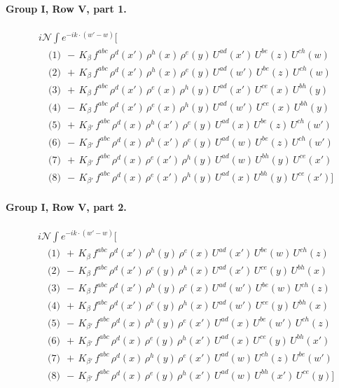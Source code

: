 \documentclass[10pt]{article}
\numberwithin{equation}{section}
\newcommand{\NN}{\mathcal N}
\begin{document}
\paragraph{Group I, Row V, part 1.}
\begin{align*}
&i\NN\int e^{-ik\cdot(w'-w)}\Big[\\
&\quad\text{(1)}\ \ -\,K_{\beta}\,f^{abc}\,\rho^{d}(x')\,\rho^{h}(x)\,\rho^{e}(y)\,U^{ad}(x')\,U^{be}(z)\,U^{ch}(w)\\
&\quad\text{(2)}\ \ +\,K_{\beta}\,f^{abc}\,\rho^{d}(x')\,\rho^{h}(x)\,\rho^{e}(y)\,U^{ad}(w')\,U^{be}(z)\,U^{ch}(w)\\
&\quad\text{(3)}\ \ +\,K_{\beta}\,f^{abc}\,\rho^{d}(x')\,\rho^{e}(x)\,\rho^{h}(y)\,U^{ad}(x')\,U^{ce}(x)\,U^{bh}(y)\\
&\quad\text{(4)}\ \ -\,K_{\beta}\,f^{abc}\,\rho^{d}(x')\,\rho^{e}(x)\,\rho^{h}(y)\,U^{ad}(w')\,U^{ce}(x)\,U^{bh}(y)\\
&\quad\text{(5)}\ \ +\,K_{\beta'}\,f^{abc}\,\rho^{d}(x)\,\rho^{h}(x')\,\rho^{e}(y)\,U^{ad}(x)\,U^{be}(z)\,U^{ch}(w')\\
&\quad\text{(6)}\ \ -\,K_{\beta'}\,f^{abc}\,\rho^{d}(x)\,\rho^{h}(x')\,\rho^{e}(y)\,U^{ad}(w)\,U^{be}(z)\,U^{ch}(w')\\
&\quad\text{(7)}\ \ +\,K_{\beta'}\,f^{abc}\,\rho^{d}(x)\,\rho^{e}(x')\,\rho^{h}(y)\,U^{ad}(w)\,U^{bh}(y)\,U^{ce}(x')\\
&\quad\text{(8)}\ \ -\,K_{\beta'}\,f^{abc}\,\rho^{d}(x)\,\rho^{e}(x')\,\rho^{h}(y)\,U^{ad}(x)\,U^{bh}(y)\,U^{ce}(x')\Big]
\end{align*}
\paragraph{Group I, Row V, part 2.}
\begin{align*}
&i\NN\int e^{-ik\cdot(w'-w)}\Big[\\
&\quad\text{(1)}\ \ +\,K_{\beta}\,f^{abc}\,\rho^{d}(x')\,\rho^{h}(y)\,\rho^{e}(x)\,U^{ad}(x')\,U^{be}(w)\,U^{ch}(z)\\
&\quad\text{(2)}\ \ -\,K_{\beta}\,f^{abc}\,\rho^{d}(x')\,\rho^{e}(y)\,\rho^{h}(x)\,U^{ad}(x')\,U^{ce}(y)\,U^{bh}(x)\\
&\quad\text{(3)}\ \ -\,K_{\beta}\,f^{abc}\,\rho^{d}(x')\,\rho^{h}(y)\,\rho^{e}(x)\,U^{ad}(w')\,U^{be}(w)\,U^{ch}(z)\\
&\quad\text{(4)}\ \ +\,K_{\beta}\,f^{abc}\,\rho^{d}(x')\,\rho^{e}(y)\,\rho^{h}(x)\,U^{ad}(w')\,U^{ce}(y)\,U^{bh}(x)\\
&\quad\text{(5)}\ \ -\,K_{\beta'}\,f^{abc}\,\rho^{d}(x)\,\rho^{h}(y)\,\rho^{e}(x')\,U^{ad}(x)\,U^{be}(w')\,U^{ch}(z)\\
&\quad\text{(6)}\ \ +\,K_{\beta'}\,f^{abc}\,\rho^{d}(x)\,\rho^{e}(y)\,\rho^{h}(x')\,U^{ad}(x)\,U^{ce}(y)\,U^{bh}(x')\\
&\quad\text{(7)}\ \ +\,K_{\beta'}\,f^{abc}\,\rho^{d}(x)\,\rho^{h}(y)\,\rho^{e}(x')\,U^{ad}(w)\,U^{ch}(z)\,U^{be}(w')\\
&\quad\text{(8)}\ \ -\,K_{\beta'}\,f^{abc}\,\rho^{d}(x)\,\rho^{e}(y)\,\rho^{h}(x')\,U^{ad}(w)\,U^{bh}(x')\,U^{ce}(y)\Big]
\end{align*}
\end{document}
